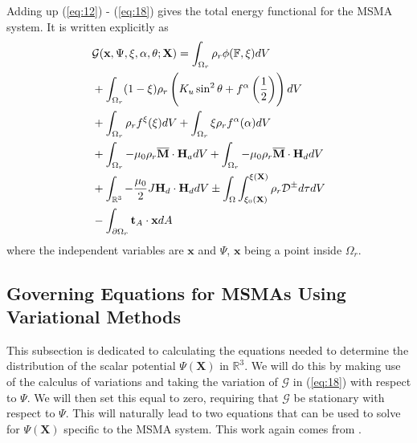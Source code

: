 \begin{multicols}{2}
Adding up (\ref{eq:12}) - (\ref{eq:18}) gives the total energy functional for the MSMA system. It is written explicitly as
\begin{align} \label{eq:19}
    &\mathcal{G}(\textbf{x}, \Psi, \xi, \alpha, \theta ; \textbf{X}) = \int_{\Omega_{r}}\rho_{r}\phi(\mathbb{F}, \xi)dV \notag \\
    &+ \int_{\Omega_{r}} (1-\xi)\rho_{r}\left(K_{u}\sin^{2}\theta + f^{\alpha}\left(\frac{1}{2}\right)\right) dV \notag \\
    &+ \int_{\Omega_{r}}\rho_{r}f^{\xi}(\xi)dV + \int_{\Omega_{r}}\xi\rho_{r}f^{\alpha}(\alpha)dV \notag \\
    &+ \int_{\Omega_{r}}-\mu_{0}\rho_{r}\overline{\textbf{M}} \cdot \textbf{H}_{a} dV + \int_{\Omega_{r}}-\mu_{0}\rho_{r}\overline{\textbf{M}} \cdot \textbf{H}_{d} dV \notag \\
    &+ \int_{\mathbb{R}^{3}}-\frac{\mu_{0}}{2} J \textbf{H}_{d}\cdot \textbf{H}_{d} dV \pm \int_{\Omega} \int_{\xi_{0}(\textbf{X})}^{\xi(\textbf{X})} \rho_{r}\mathcal{D}^{\pm}d\tau dV \notag \\
    &- \int_{\partial\Omega_{r}}\textbf{t}_{A}\cdot \textbf{x} dA
\end{align}
where the independent variables are $\textbf{x}$ and $\Psi$, $\textbf{x}$ being a point inside $\Omega_{r}$. 


\subsection{Governing Equations for MSMAs Using Variational Methods}
This subsection is dedicated to calculating the equations needed to determine the distribution of the scalar potential $\Psi(\textbf{X})$ in $\mathbb{R}^{3}$. We will do this by making use of the calculus of variations and taking the variation of $\mathcal{G}$ in (\ref{eq:18}) with respect to $\Psi$. We will then set this equal to zero, requiring that $\mathcal{G}$ be stationary with respect to $\Psi$. This will naturally lead to two equations that can be used to solve for $\Psi(\textbf{X})$ specific to the MSMA system. This work again comes from \cite{wang2012variational}.


\end{multicols}
